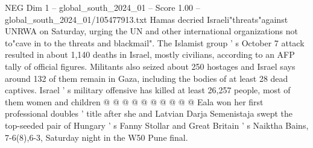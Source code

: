 \begin{textsample}{NEG Dim 1 – global\_south\_2024\_01 – Score 1.00 – global\_south\_2024\_01/105477913.txt}
Hamas decried Israeli"threats"against UNRWA on Saturday, urging the UN and other international organizations not to"cave in to the threats and blackmail".
The Islamist group ' s October 7 attack resulted in about 1,140 deaths in Israel, mostly civilians, according to an AFP tally of official figures.
Militants also seized about 250 hostages and Israel says around 132 of them remain in Gaza, including the bodies of at least 28 dead captives.
Israel ' s military offensive has killed at least 26,257 people, most of them women and children @ @ @ @ @ @ @ @ @ @ Eala won her first professional doubles ' title after she and Latvian Darja Semenistaja swept the top-seeded pair of Hungary ' s Fanny Stollar and Great Britain ' s Naiktha Bains, 7-6(8),6-3, Saturday night in the W50 Pune final.

\end{textsample}
